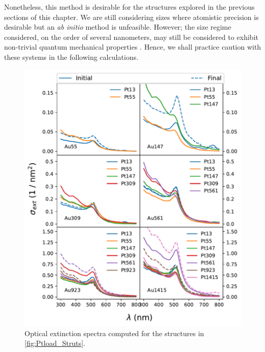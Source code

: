 Nonetheless, this method is desirable for the structures explored in the previous sections of this chapter. We are still considering sizes where atomistic precision is desirable but an \textit{ab initio} method is unfeasible. However; the size regime considered, on the order of several nanometers, may still be considered to exhibit non-trivial quantum mechanical properties \cite{QuantumPlasmonCoupling}. Hence, we shall practice caution with these systems in the following calculations.

\begin{figure}
\centering
\includegraphics[width=\textwidth]{figures/MD/Coal/Specs.pdf}
\caption{Optical extinction spectra computed for the structures in \ref{fig:Ptload_Struts}.}
\label{fig:GDM_Ih}
\end{figure}

